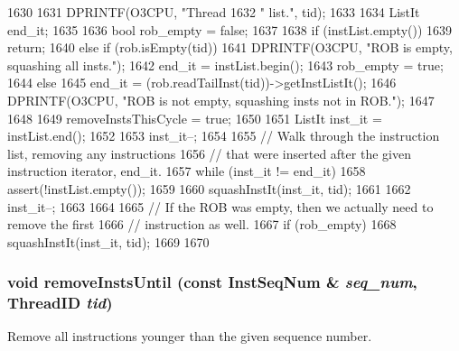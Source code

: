 \begin{DoxyCode}
1630 {
1631     DPRINTF(O3CPU, "Thread %
1632             " list.\n", tid);
1633 
1634     ListIt end_it;
1635 
1636     bool rob_empty = false;
1637 
1638     if (instList.empty()) {
1639         return;
1640     } else if (rob.isEmpty(tid)) {
1641         DPRINTF(O3CPU, "ROB is empty, squashing all insts.\n");
1642         end_it = instList.begin();
1643         rob_empty = true;
1644     } else {
1645         end_it = (rob.readTailInst(tid))->getInstListIt();
1646         DPRINTF(O3CPU, "ROB is not empty, squashing insts not in ROB.\n");
1647     }
1648 
1649     removeInstsThisCycle = true;
1650 
1651     ListIt inst_it = instList.end();
1652 
1653     inst_it--;
1654 
1655     // Walk through the instruction list, removing any instructions
1656     // that were inserted after the given instruction iterator, end_it.
1657     while (inst_it != end_it) {
1658         assert(!instList.empty());
1659 
1660         squashInstIt(inst_it, tid);
1661 
1662         inst_it--;
1663     }
1664 
1665     // If the ROB was empty, then we actually need to remove the first
1666     // instruction as well.
1667     if (rob_empty) {
1668         squashInstIt(inst_it, tid);
1669     }
1670 }
\end{DoxyCode}
\hypertarget{classFullO3CPU_a79f7e36d4bd89fe4528b665a949a0023}{
\subsubsection[{removeInstsUntil}]{\setlength{\rightskip}{0pt plus 5cm}void removeInstsUntil (const {\bf InstSeqNum} \& {\em seq\_\-num}, \/  {\bf ThreadID} {\em tid})}}
\label{classFullO3CPU_a79f7e36d4bd89fe4528b665a949a0023}
Remove all instructions younger than the given sequence number. 


